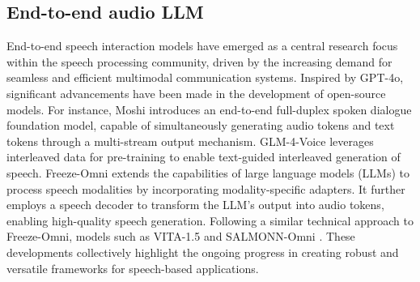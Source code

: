 \subsection{End-to-end audio LLM}
End-to-end speech interaction models have emerged as a central research focus within the speech processing community, driven by the increasing demand for seamless and efficient multimodal communication systems. Inspired by GPT-4o\cite{HelloGPT4o}, significant advancements have been made in the development of open-source models. For instance, Moshi \cite{defossez2024moshi} introduces an end-to-end full-duplex spoken dialogue foundation model, capable of simultaneously generating audio tokens and text tokens through a multi-stream output mechanism. GLM-4-Voice \cite{zeng2024glm} leverages interleaved data for pre-training to enable text-guided interleaved generation of speech. Freeze-Omni \cite{wang2024freeze} extends the capabilities of large language models (LLMs) to process speech modalities by incorporating modality-specific adapters. It further employs a speech decoder to transform the LLM's output into audio tokens, enabling high-quality speech generation. Following a similar technical approach to Freeze-Omni, models such as VITA-1.5 \cite{fu2025vita} and SALMONN-Omni \cite{yu2024salmonn}. These developments collectively highlight the ongoing progress in creating robust and versatile frameworks for speech-based applications.
